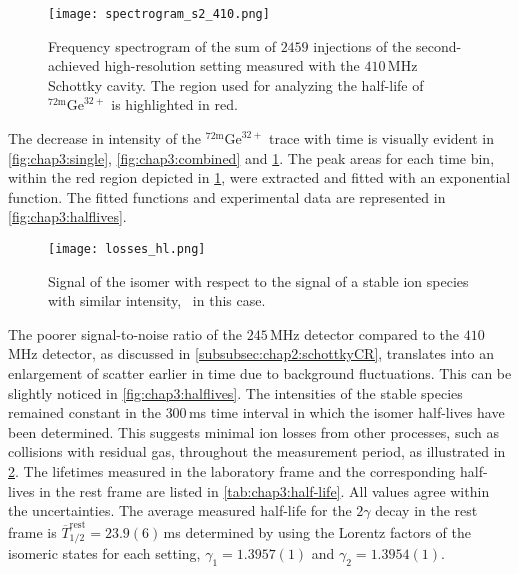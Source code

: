 \begin{figure}[hbt]
  \centering
  \texttt{[image: spectrogram\_s2\_410.png]}
  \caption{Frequency spectrogram of the sum of $2459$ injections of the second-achieved high-resolution setting measured with the $410$\,MHz Schottky cavity. The region used for analyzing the half-life of $^{72\mathrm{m}}\mathrm{Ge}^{32+}$ is highlighted in red.}
  \label{fig:chap3:spect4102}
\end{figure}

The decrease in intensity of the $^{72\mathrm{m}}\mathrm{Ge}^{32+}$ trace with time is visually evident in \cref{fig:chap3:single}, \cref{fig:chap3:combined} and \cref{fig:chap3:spect4102}.
The peak areas for each time bin, within the red region depicted in \cref{fig:chap3:spect4102}, were extracted and fitted with an exponential function. The fitted functions and experimental data are represented in \cref{fig:chap3:halflives}.
\begin{figure}[hbt]
  \centering
  \texttt{[image: losses\_hl.png]}
  \caption{Signal of the isomer with respect to the signal of a stable ion species with similar intensity, \, in this case.}
  \label{fig:chap3:losses_ms}
\end{figure}
The poorer signal-to-noise ratio of the $245$\,MHz detector compared to the $410$\,MHz detector, as discussed in \cref{subsubsec:chap2:schottkyCR}, translates into an enlargement of scatter earlier in time due to background fluctuations. This can be slightly noticed in \cref{fig:chap3:halflives}.
The intensities of the stable species remained constant in the $300$\,ms time interval in which the isomer half-lives have been determined. This suggests minimal ion losses from other processes, such as collisions with residual gas, throughout the measurement period, as illustrated in \cref{fig:chap3:losses_ms}.
\newpar
The lifetimes measured in the laboratory frame and the corresponding half-lives in the rest frame are listed in \cref{tab:chap3:half-life}. All values agree within the uncertainties. The average measured half-life for the $2\gamma$ decay in the rest frame is $\overline{T}_{1/2}^{\mathrm{rest}} = 23.9\left(6\right)$\,ms determined by using the Lorentz factors of the isomeric states for each setting, $\gamma_1 = 1.3957\left(1\right)$ and $\gamma_2 = 1.3954\left(1\right)$.

